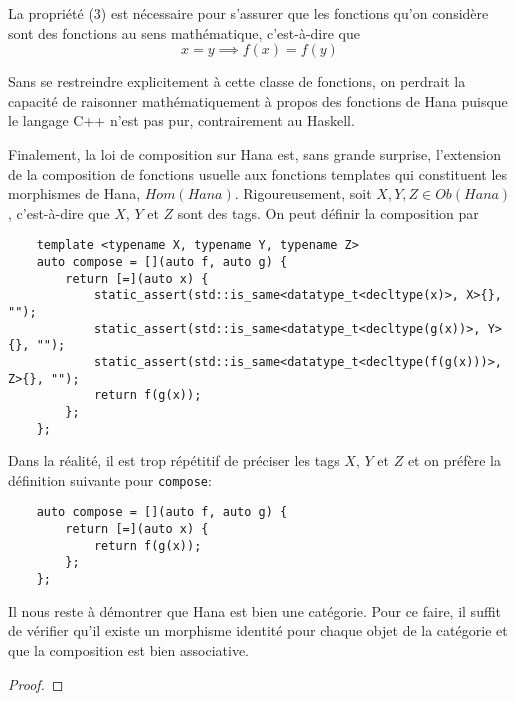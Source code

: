 La propriété (3) est nécessaire pour s'assurer que les fonctions qu'on
considère sont des fonctions au sens mathématique, c'est-à-dire que
\[
    x = y \implies f(x) = f(y)
\]

Sans se restreindre explicitement à cette classe de fonctions, on perdrait la
capacité de raisonner mathématiquement à propos des fonctions de Hana puisque
le langage C++ n'est pas pur, contrairement au Haskell.

Finalement, la loi de composition sur Hana est, sans grande surprise,
l'extension de la composition de fonctions usuelle aux fonctions templates
qui constituent les morphismes de Hana, $Hom(Hana)$. Rigoureusement, soit
$X, Y, Z \in Ob(Hana)$, c'est-à-dire que $X$, $Y$ et $Z$ sont des tags.
On peut définir la composition par
\begin{verbatim}
    template <typename X, typename Y, typename Z>
    auto compose = [](auto f, auto g) {
        return [=](auto x) {
            static_assert(std::is_same<datatype_t<decltype(x)>, X>{}, "");
            static_assert(std::is_same<datatype_t<decltype(g(x))>, Y>{}, "");
            static_assert(std::is_same<datatype_t<decltype(f(g(x)))>, Z>{}, "");
            return f(g(x));
        };
    };
\end{verbatim}

Dans la réalité, il est trop répétitif de préciser les tags $X$, $Y$ et $Z$
et on préfère la définition suivante pour {\tt compose}:
\begin{verbatim}
    auto compose = [](auto f, auto g) {
        return [=](auto x) {
            return f(g(x));
        };
    };
\end{verbatim}

Il nous reste à démontrer que Hana est bien une catégorie. Pour ce faire, il
suffit de vérifier qu'il existe un morphisme identité pour chaque objet de
la catégorie et que la composition est bien associative.

\begin{proof}

\end{proof}
